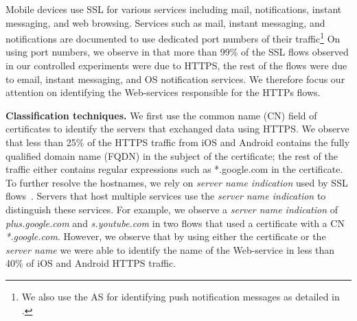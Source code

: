 
Mobile devices use SSL for various services including mail, notifications, instant messaging, and web browsing.
Services such as mail, instant messaging, and notifications are documented to use dedicated port numbers of their traffic\footnote{We also use the AS for identifying push notification messages as detailed in .}
On using port numbers, we observe in that more than 99\% of the SSL flows observed in our controlled experiments were due to HTTPS, the rest of the flows were due to email, instant messaging, and OS notification services. 
We therefore focus our attention on identifying the Web-services responsible for the HTTPs flows. 

\noindent\textbf{Classification techniques.} We first use the common name (CN) field of certificates to identify the servers that exchanged data using HTTPS.
We observe that less than 25\% of the HTTPS traffic from iOS and Android contains the fully qualified domain name (FQDN) in the subject of the certificate; the rest of the traffic either contains regular expressions such as *.google.com in the certificate.
To further resolve the hostnames, we rely on \emph{server name indication} used by SSL flows~\cite{rfc:servernametls}.
Servers that host multiple services use the \emph{server name indication} to distinguish these services.   
For example, we observe a \emph{server name indication} of \emph{plus.google.com} and \emph{s.youtube.com} in two flows that used a certificate with a CN \emph{*.google.com}.
However, we observe that by using either the certificate or the \emph{server name} we were able to identify the name of the Web-service in less than 40\% of iOS and Android HTTPS traffic.

